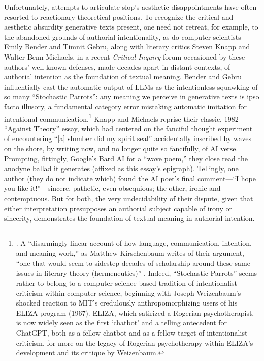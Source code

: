 \documentclass{simple-humanities}         %
\begin{document}
Unfortunately, attempts to articulate slop's aesthetic disappointments have often resorted to reactionary theoretical positions. 
To recognize the critical and aesthetic absurdity generative texts present, one need not retreat, for example, to the abandoned grounds of authorial intentionality, as do computer scientists Emily Bender and Timnit Gebru, along with literary critics Steven Knapp and Walter Benn Michaels, in a recent \emph{Critical Inquiry} forum occasioned by these authors' well-known defenses, made decades apart in distant contexts, of authorial intention as the foundation of textual meaning.
Bender and Gebru influentially cast the automatic output of LLMs as the intentionless squawking of so many ``Stochastic Parrots'': any meaning we perceive in generative texts is ipso facto illusory, a fundamental category error mistaking automatic imitation for intentional communication.\footnote{\textcite{benderDangersStochasticParrots2021a}. A ``disarmingly linear account of how language, communication, intention, and meaning work,'' as Matthew Kirschenbaum writes of their argument, ``one that would seem to sidestep decades of scholarship around these same issues in literary theory (hermeneutics)'' \parencite{kirschenbaumAgainTheory2023}. Indeed, ``Stochastic Parrots'' seems rather to belong to a computer-science-based tradition of intentionalist criticism within computer science, beginning with Joseph Weizenbaum's shocked reaction to MIT's credulously anthropomorphizing users of his ELIZA program (1967). ELIZA, which satirized a Rogerian psychotherapist, is now widely seen as the first `chatbot' and a telling antecedent for ChatGPT, both as a fellow chatbot and as a fellow target of intentionalist criticism. \textcite{bassettComputationalTherapeutic2019} for more on the legacy of Rogerian psychotherapy within ELIZA's development and its critique by Weizenbaum.}  
Knapp and Michaels reprise their classic, 1982 ``Against Theory'' essay, which had centered on the fanciful thought experiment of encountering ``[a] slumber did my spirit seal'' accidentally inscribed by waves on the shore, by writing now, and no longer quite so fancifully, of AI verse.
Prompting, fittingly, Google's Bard AI for a ``wave poem,'' they close read the anodyne ballad it generates (affixed as this essay's epigraph). 
Tellingly, one author (they do not indicate which) found the AI poet's final comment---``I hope you like it!''---sincere, pathetic, even obsequious; the other, ironic and contemptuous.
But for both, the very undecidability of their dispute, given that either interpretation presupposes an authorial subject capable of irony or sincerity, demonstrates the foundation of textual meaning in authorial intention.
\end{document}
